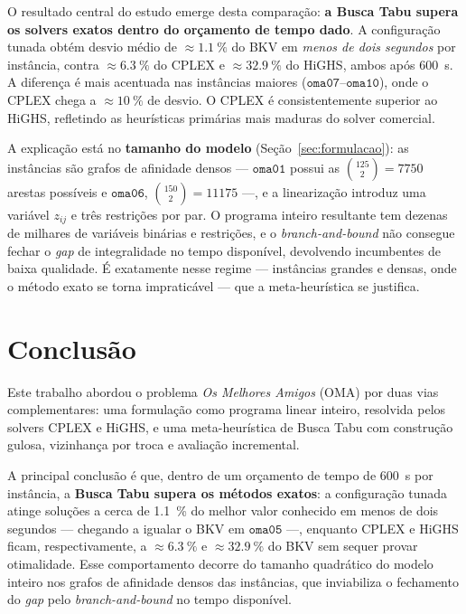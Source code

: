 \documentclass[a4paper,11pt]{article}
\begin{document}
O resultado central do estudo emerge desta comparação: \textbf{a Busca Tabu supera os
solvers exatos dentro do orçamento de tempo dado}. A configuração tunada obtém desvio médio
de $\approx \SI{1.1}{\percent}$ do BKV em \emph{menos de dois segundos} por instância,
contra $\approx \SI{6.3}{\percent}$ do CPLEX e $\approx \SI{32.9}{\percent}$ do HiGHS, ambos
após \SI{600}{\second}. A diferença é mais acentuada nas instâncias maiores
($\texttt{oma07}$--$\texttt{oma10}$), onde o CPLEX chega a $\approx \SI{10}{\percent}$ de
desvio. O CPLEX é consistentemente superior ao HiGHS, refletindo as heurísticas primárias
mais maduras do solver comercial.

A explicação está no \textbf{tamanho do modelo} (Seção~\ref{sec:formulacao}): as instâncias
são grafos de afinidade densos --- $\texttt{oma01}$ possui as $\binom{125}{2}=7750$ arestas
possíveis e $\texttt{oma06}$, $\binom{150}{2}=11175$ ---, e a linearização introduz uma
variável $z_{ij}$ e três restrições por par. O programa inteiro resultante tem dezenas de
milhares de variáveis binárias e restrições, e o \emph{branch-and-bound} não consegue fechar
o \emph{gap} de integralidade no tempo disponível, devolvendo incumbentes de baixa
qualidade. É exatamente nesse regime --- instâncias grandes e densas, onde o método exato se
torna impraticável --- que a meta-heurística se justifica.

\FloatBarrier
\section{Conclusão}
\label{sec:conclusao}

Este trabalho abordou o problema \emph{Os Melhores Amigos} (OMA) por duas vias
complementares: uma formulação como programa linear inteiro, resolvida pelos solvers CPLEX
e HiGHS, e uma meta-heurística de Busca Tabu com construção gulosa, vizinhança por troca e
avaliação incremental.

A principal conclusão é que, dentro de um orçamento de tempo de \SI{600}{\second} por
instância, a \textbf{Busca Tabu supera os métodos exatos}: a configuração tunada atinge
soluções a cerca de \SI{1.1}{\percent} do melhor valor conhecido em menos de dois segundos
--- chegando a igualar o BKV em $\texttt{oma05}$ ---, enquanto CPLEX e HiGHS ficam,
respectivamente, a $\approx \SI{6.3}{\percent}$ e $\approx \SI{32.9}{\percent}$ do BKV sem
sequer provar otimalidade. Esse comportamento decorre do tamanho quadrático do modelo
inteiro nos grafos de afinidade densos das instâncias, que inviabiliza o fechamento do
\emph{gap} pelo \emph{branch-and-bound} no tempo disponível.
\end{document}
